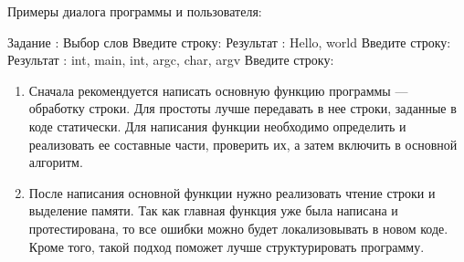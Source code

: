 Примеры диалога программы и пользователя:

\begin{zzoutput}
  Задание : Выбор слов
  Введите строку: 
  Результат     : Hello, world
  Введите строку: 
  Результат     : int, main, int, argc, char, argv
  Введите строку: \zzuser{ }
\end{zzoutput}




%


\zzsectionPLAN


\begin{enumerate}
\item Сначала рекомендуется написать основную функцию программы --- обработку строки. Для простоты лучше передавать в нее строки, заданные в коде статически. Для написания функции необходимо определить и реализовать ее составные части, проверить их, а затем включить в основной алгоритм.
\item После написания основной функции нужно реализовать чтение строки и выделение памяти. Так как главная функция уже была написана и протестирована, то все ошибки можно будет локализовывать в новом коде. Кроме того, такой подход поможет лучше структурировать программу.
\end{enumerate}


